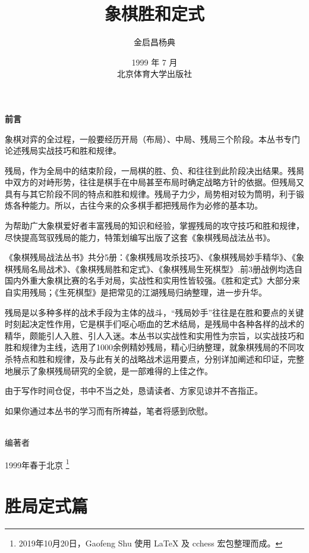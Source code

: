 \documentclass[UTF8]{ctexbook}
\title{象棋胜和定式}
\author{金启昌\quad 杨\quad 典}
\date{1999 年 7 月  \\ \vspace{14cm} 北京体育大学出版社
}
\begin{document}
\maketitle

\thispagestyle{empty}
\begin{center}
{\textbf{前言} }
\end{center}
\vspace{3cm}

象棋对弈的全过程，一般要经历开局（布局）、中局、残局三个阶段。本丛书专门论述残局实战技巧和胜和规律。

残局，作为全局中的结束阶段，一局棋的胜、负、和往往到此阶段决出结果。残晑中双方的对峙形势，往往是棋手在中局甚至布局时确定战略方针的依据。但残局又具有与其它阶段不同的特点和胜和规律。残局子力少，局势相对较为筒明，利于锻炼各种能力。所以，古往今来的众多棋手都把残局作为必修的基本功。

为帮助广大象棋爱好者丰富残局的知识和经验，掌握残局的攻守技巧和胜和规律，尽快提高驾驭残局的能力，特策划编写出版了这套《象棋残局战法丛书》。

《象棋残局战法丛书》共分5册：《象棋残局攻杀技巧》、《象棋残局妙手精华》、《象棋残局名局战术》、《象棋残局胜和定式》、《象棋残局生死棋型》.前3册战例均选自国内外重大象棋比赛的名手对局，实战性和实用性皆较强。《胜和定式》大部分来自实用残局；《生死棋型》是把常见的江湖残局归纳整理，进一步升华。

残局是以多种多样的战术手段为主体的战斗，“残局妙手”往往是在胜和要点的关键时刻起决定性作用，它是棋手们呕心呖血的艺术结局，是残局中各种各样的战术的精华，颇能引人入胜、引人入迷。本丛书以实战性和实用性为宗旨，以实战技巧和胜和规律为主线，选用了1000余例精妙残局，精心归纳整理，就象棋残局的不同攻杀特点和胜和规律，及与此有关的战略战术运用要点，分别详加阐述和印证，完整地展示了象棋残局研究的全貌，是一部难得的上佳之作。

由于写作时间仓促，书中不当之处，恳请读者、方家见谅并不吝指正。

如果你通过本丛书的学习而有所裨益，笔者将感到欣慰。

~\\

编著者

1999年春于北京 \footnote{2019年10月20日，Gaofeng Shu 使用 \LaTeX{} 及 cchess 宏包整理而成。}


\clearpage
\tableofcontents
\thispagestyle{empty}


\clearpage
\chapter{胜局定式篇}
\setcounter{page}{1}
\end{document}

